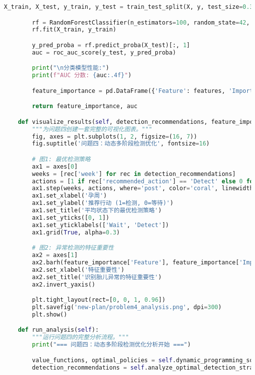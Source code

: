 \documentclass[UTF8, a4paper, 11pt]{ctexart}
\begin{document}
\begin{lstlisting}[language=Python, caption={问题四的解决方案脚本。}]
        X_train, X_test, y_train, y_test = train_test_split(X, y, test_size=0.3, random_state=42, stratify=y)

        rf = RandomForestClassifier(n_estimators=100, random_state=42, class_weight='balanced')
        rf.fit(X_train, y_train)

        y_pred_proba = rf.predict_proba(X_test)[:, 1]
        auc = roc_auc_score(y_test, y_pred_proba)

        print("\n分类模型性能:")
        print(f"AUC 分数: {auc:.4f}")

        feature_importance = pd.DataFrame({'Feature': features, 'Importance': rf.feature_importances_}).sort_values('Importance', ascending=False)

        return feature_importance, auc

    def visualize_results(self, detection_recommendations, feature_importance):
        """为问题四创建一套完整的可视化图表。"""
        fig, axes = plt.subplots(1, 2, figsize=(16, 7))
        fig.suptitle('问题四：动态多阶段检测优化', fontsize=16)

        # 图1: 最优检测策略
        ax1 = axes[0]
        weeks = [rec['week'] for rec in detection_recommendations]
        actions = [1 if rec['recommended_action'] == 'Detect' else 0 for rec in detection_recommendations]
        ax1.step(weeks, actions, where='post', color='coral', linewidth=3)
        ax1.set_xlabel('孕周')
        ax1.set_ylabel('推荐行动 (1=检测, 0=等待)')
        ax1.set_title('平均状态下的最优检测策略')
        ax1.set_yticks([0, 1])
        ax1.set_yticklabels(['Wait', 'Detect'])
        ax1.grid(True, alpha=0.3)

        # 图2: 异常检测的特征重要性
        ax2 = axes[1]
        ax2.barh(feature_importance['Feature'], feature_importance['Importance'], color='skyblue', edgecolor='black')
        ax2.set_xlabel('特征重要性')
        ax2.set_title('识别胎儿异常的特征重要性')
        ax2.invert_yaxis()

        plt.tight_layout(rect=[0, 0, 1, 0.96])
        plt.savefig('new-plan/problem4_analysis.png', dpi=300)
        plt.show()

    def run_analysis(self):
        """运行问题四的完整分析流程。"""
        print("=== 问题四：动态多阶段检测优化分析开始 ===")

        value_functions, optimal_policies = self.dynamic_programming_solver()
        detection_recommendations = self.analyze_optimal_detection_strategy(optimal_policies)


\end{lstlisting}
\end{document}
